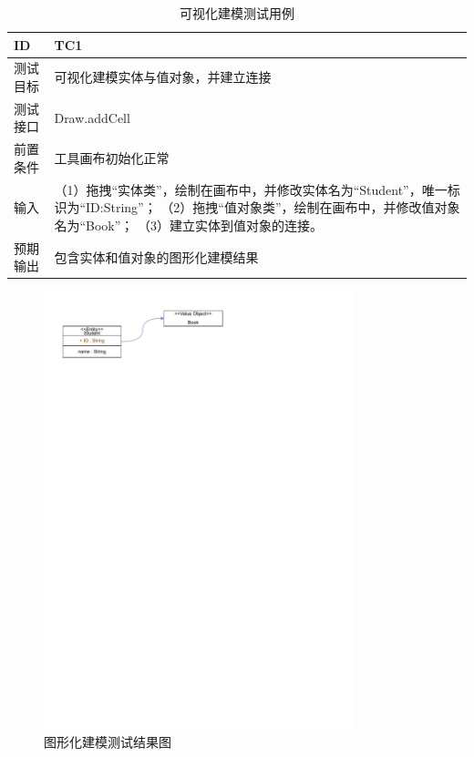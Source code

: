 {\footnotesize
\begin{longtable}[h]{m{80pt}|m{305pt}}
    \caption[可视化建模测试用例]{可视化建模测试用例} \label{testcase1} \\
        \hline  
        ID&TC1\\
        \hline
        测试目标&可视化建模实体与值对象，并建立连接\\
        \hline
        测试接口&Draw.addCell\\
        \hline
        前置条件&工具画布初始化正常\\
        \hline
        输入&（1）拖拽“实体类”，绘制在画布中，并修改实体名为“Student”，唯一标识为“ID:String”；
            \newline（2）拖拽“值对象类”，绘制在画布中，并修改值对象名为“Book”；
            \newline（3）建立实体到值对象的连接。\\
        \hline
        预期输出&包含实体和值对象的图形化建模结果\\
        \hline  

    \end{longtable} 
}
    \begin{figure}[!htbp] %
        \centering %
        \includegraphics[width=0.8\textwidth]{FIGs/chapter5/Ftestcase1.pdf} %
        \caption{图形化建模测试结果图} %
        \label{Ftestcase1} %
    \end{figure}%

